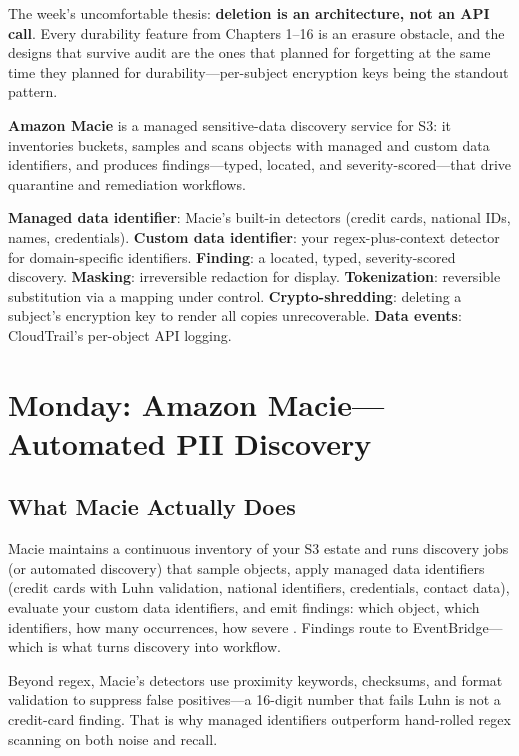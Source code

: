 The week's uncomfortable thesis: \textbf{deletion is an architecture, not an API call}. Every durability feature from Chapters 1--16 is an erasure obstacle, and the designs that survive audit are the ones that planned for forgetting at the same time they planned for durability---per-subject encryption keys being the standout pattern.

\begin{definitionbox}
\textbf{Amazon Macie} is a managed sensitive-data discovery service for S3: it inventories buckets, samples and scans objects with managed and custom data identifiers, and produces findings---typed, located, and severity-scored---that drive quarantine and remediation workflows.
\end{definitionbox}

\begin{keyterms}
\textbf{Managed data identifier}: Macie's built-in detectors (credit cards, national IDs, names, credentials). \textbf{Custom data identifier}: your regex-plus-context detector for domain-specific identifiers. \textbf{Finding}: a located, typed, severity-scored discovery. \textbf{Masking}: irreversible redaction for display. \textbf{Tokenization}: reversible substitution via a mapping under control. \textbf{Crypto-shredding}: deleting a subject's encryption key to render all copies unrecoverable. \textbf{Data events}: CloudTrail's per-object API logging.
\end{keyterms}

\section{Monday: Amazon Macie---Automated PII Discovery}
\subsection{What Macie Actually Does}
Macie maintains a continuous inventory of your S3 estate and runs discovery jobs (or automated discovery) that sample objects, apply managed data identifiers (credit cards with Luhn validation, national identifiers, credentials, contact data), evaluate your custom data identifiers, and emit findings: which object, which identifiers, how many occurrences, how severe \cite{awsMacieDocs}. Findings route to EventBridge---which is what turns discovery into workflow.

Beyond regex, Macie's detectors use proximity keywords, checksums, and format validation to suppress false positives---a 16-digit number that fails Luhn is not a credit-card finding. That is why managed identifiers outperform hand-rolled regex scanning on both noise and recall.

